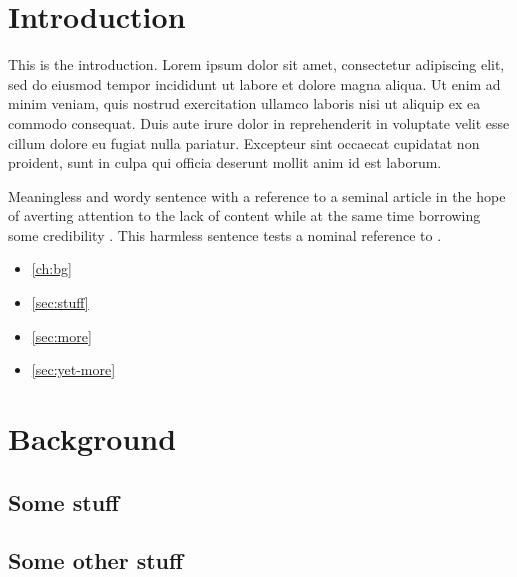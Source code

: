 \documentclass[english]{ufsc-thesis-rn46-2019}
\begin{document}
\pretextual%
\imprimircapa%
\imprimirfolhaderosto*%
\clearpage
\tableofcontents%
\textual%
\cleardoublepage

\chapter{Introduction}

This is the introduction. Lorem ipsum dolor sit amet, consectetur adipiscing elit, sed do eiusmod tempor incididunt ut labore et dolore magna aliqua. Ut enim ad minim veniam, quis nostrud exercitation ullamco laboris nisi ut aliquip ex ea commodo consequat. Duis aute irure dolor in reprehenderit in voluptate velit esse cillum dolore eu fugiat nulla pariatur. Excepteur sint occaecat cupidatat non proident, sunt in culpa qui officia deserunt mollit anim id est laborum.

Meaningless and wordy sentence with a reference to a seminal article in the hope of averting attention to the lack of content while at the same time borrowing some credibility \cite{turing1937computable}. This harmless sentence tests a nominal reference to .

\begin{itemize}
\item \autoref{ch:bg}
\item \autoref{sec:stuff}
\item \autoref{sec:more}
\item \autoref{sec:yet-more}
\end{itemize}

\lipsum[1]

\chapter{Background}
\label{ch:bg}

\lipsum[1]

\section{Some stuff}
\label{sec:stuff}

\lipsum[1]

\section{Some other stuff}
\end{document}
